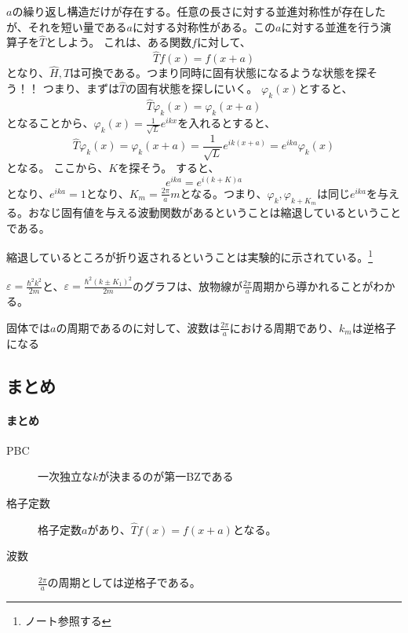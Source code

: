 \documentclass[titlepage]{ltjsarticle}
\begin{document}
\(a\)の繰り返し構造だけが存在する。任意の長さに対する並進対称性が存在したが、それを短い量である\(a\)に対する対称性がある。この\(a\)に対する並進を行う演算子を\(\hat{T}\)としよう。
これは、ある関数\(f\)に対して、
\begin{equation}
  \hat{T} f(x) = f(x+a)
\end{equation}
となり、\(\hat{H},\hat{T}\)は可換である。つまり同時に固有状態になるような状態を探そう！！
つまり、まずは\(\hat{T}\)の固有状態を探しにいく。
\(\varphi_k(x)\)とすると、
\begin{equation}
  \hat{T} \varphi_k(x) = \varphi_k(x+a)
\end{equation}
となることから、\(\varphi_k(x)=\frac{1}{\sqrt{L}}e^{ikx}\)を入れるとすると、
\begin{equation}
  \hat{T} \varphi_k(x) = \varphi_k(x+a) = \frac{1}{\sqrt{L}} e^{ik(x+a)} = e^{ika} \varphi_k(x)
\end{equation}
となる。
ここから、\(K\)を探そう。
すると、
\begin{equation}
  e^{ika} = e^{i(k+K)a}
\end{equation}
となり、\(e^{ika}=1\)となり、\(K_m= \frac{2 \pi}{a}m\)となる。つまり、\(\varphi_k,\varphi_{k+K_m}\)は同じ\(e^{ika}\)を与える。おなじ固有値を与える波動関数があるということは縮退しているということである。


縮退しているところが折り返されるということは実験的に示されている。\footnote{
  ノート参照する
}

\(\varepsilon = \frac{\hbar^2 k^2}{2m}\)と、\(\varepsilon = \frac{\hbar^2(k\pm K_1)^2}{2m}\)のグラフは、放物線が\(\frac{2\pi}{a}\)周期から導かれることがわかる。

固体では\(a\)の周期であるのに対して、波数は\(\frac{2\pi}{a}\)における周期であり、\(k_m\)は逆格子になる

\subsection{まとめ}
\paragraph{まとめ}
\begin{description}
  \item[PBC] 一次独立な\(k\)が決まるのが第一BZである
  \item[格子定数] 格子定数\(a\)があり、\(\hat{T}f(x)= f(x+a)\)となる。
  \item[波数] \(\frac{2\pi}{a}\)の周期としては逆格子である。
\end{description}
\end{document}
